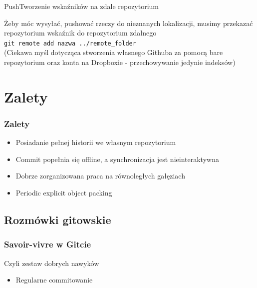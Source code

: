 \documentclass{beamer}
\begin{document}
\begin{frame}{Push}{Tworzenie wskaźników na zdale repozytorium}

 Żeby móc wysyłać, pushować rzeczy do nieznanych lokalizacji, musimy przekazać 
 repozytorium wskaźnik do repozytorium zdalnego \\
 \texttt{git remote add nazwa ../remote\_folder} \\
 \vspace{3mm}
 (Ciekawa myśl dotycząca stworzenia własnego Githuba za pomocą 
 bare repozytorium oraz konta na Dropboxie - przechowywanie jedynie indeksów)
 
\end{frame}


\section{Zalety}

\begin{frame}
\frametitle{Zalety}
\begin{itemize}
 \item Posiadanie pełnej historii we własnym repozytorium
 \item Commit popełnia się offline, a synchronizacja jest nieinteraktywna
 \item Dobrze zorganizowana praca na równoległych gałęziach
 \item Periodic explicit object packing
\end{itemize}
 
\end{frame}

\subsection{Rozmówki gitowskie}
\begin{frame}
 \frametitle{Savoir-vivre w Gitcie}{Czyli zestaw dobrych nawyków}
 \begin{itemize}
  \item Regularne commitowanie
 \end{itemize}

\end{frame}
\end{document}
